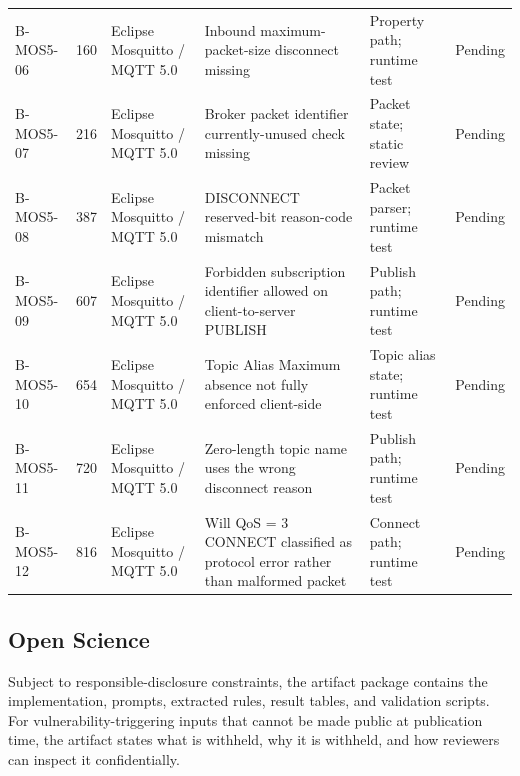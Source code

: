 \begin{table}[p]
\begin{tabular}{p{}p{}p{}p{}p{}p{}}
B-MOS5-06 & 160 & Eclipse Mosquitto / MQTT 5.0 & Inbound maximum-packet-size disconnect missing & Property path; runtime test & Pending \\
B-MOS5-07 & 216 & Eclipse Mosquitto / MQTT 5.0 & Broker packet identifier currently-unused check missing & Packet state; static review & Pending \\
B-MOS5-08 & 387 & Eclipse Mosquitto / MQTT 5.0 & DISCONNECT reserved-bit reason-code mismatch & Packet parser; runtime test & Pending \\
B-MOS5-09 & 607 & Eclipse Mosquitto / MQTT 5.0 & Forbidden subscription identifier allowed on client-to-server PUBLISH & Publish path; runtime test & Pending \\
B-MOS5-10 & 654 & Eclipse Mosquitto / MQTT 5.0 & Topic Alias Maximum absence not fully enforced client-side & Topic alias state; runtime test & Pending \\
B-MOS5-11 & 720 & Eclipse Mosquitto / MQTT 5.0 & Zero-length topic name uses the wrong disconnect reason & Publish path; runtime test & Pending \\
B-MOS5-12 & 816 & Eclipse Mosquitto / MQTT 5.0 & Will QoS = 3 CONNECT classified as protocol error rather than malformed packet & Connect path; runtime test & Pending \\
\bottomrule
\end{tabular}
\end{table}

\clearpage

\subsection{Open Science}

Subject to responsible-disclosure constraints, the artifact package contains
the implementation, prompts, extracted rules, result tables, and validation
scripts. For vulnerability-triggering inputs that cannot be made public at
publication time, the artifact states what is withheld, why it is withheld, and
how reviewers can inspect it confidentially.

